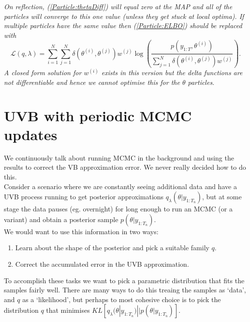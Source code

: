 \documentclass[
12pt, %
onehalfspacing, %
nohyperref, %
headsepline, %
chapterinoneline, %
]{MastersDoctoralThesis} %
\begin{document}
\textit{On reflection, (\ref{Particle:thetaDiff}) will equal zero at the MAP and all of the particles will converge to this one value (unless they get stuck at local optima). If multiple particles have the same value then (\ref{Particle:ELBO}) should be replaced with
\begin{equation}
\mathcal{L}(q, \lambda) = \sum_{i=1}^N \sum_{j=1}^N \delta(\theta^{(i)}, \theta^{(j)})w^{(j)} \log \left( \frac{p\left(y_{1:T}, \theta^{(i)}\right)}{ \sum_{j=1}^N \delta(\theta^{(i)}, \theta^{(j)})w^{(j)}} \right).
\end{equation}
A closed form solution for $w^{(i)}$ exists in this version but the delta functions are not differentiable and hence we cannot optimise this for the $\theta$ particles.}

\iffalse
\section{UVB with periodic MCMC updates}

We continuously talk about running MCMC in the background and using the results to correct the VB approximation error. We never really decided how to do this.
\\

Consider a scenario where we are constantly seeing additional data and have a UVB process running to get posterior approximations $q_{\lambda}(\theta | y_{1:T_n})$, but at some stage the data pauses (eg. overnight) for long enough to run an MCMC (or a variant) and obtain a posterior sample $p(\theta | y_{1:T_n})$. 
\\

We would want to use this information in two ways:
\begin{enumerate}
\item Learn about the shape of the posterior and pick a suitable family $q$.
\item Correct the accumulated error in the UVB approximation.
\end{enumerate}

To accomplish these tasks we want to pick a parametric distribution that fits the samples fairly well. There are many ways to do this treaing the samples as `data', and $q$ as a `likelihood', but perhaps to most cohesive choice is to pick the distribution $q$ that minimises $KL[q_{\lambda}(\theta | y_{1:T_n}) || p(\theta | y_{1:T_n})]$.
\\
\end{document}
